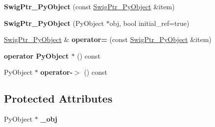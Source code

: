 \begin{DoxyCompactItemize}
\item 
\hypertarget{classswig_1_1SwigPtr__PyObject_a4282f20207f8cd22c9b079203c832a04}{
{\bfseries SwigPtr\_\-PyObject} (const \hyperlink{classswig_1_1SwigPtr__PyObject}{SwigPtr\_\-PyObject} \&item)}
\label{d2/d50/classswig_1_1SwigPtr__PyObject_a4282f20207f8cd22c9b079203c832a04}

\item 
\hypertarget{classswig_1_1SwigPtr__PyObject_a4503d58d577d209f5e1fa67026852505}{
{\bfseries SwigPtr\_\-PyObject} (PyObject $\ast$obj, bool initial\_\-ref=true)}
\label{d2/d50/classswig_1_1SwigPtr__PyObject_a4503d58d577d209f5e1fa67026852505}

\item 
\hypertarget{classswig_1_1SwigPtr__PyObject_a86d8657d6b4a27c8e9e6942bc1ba572c}{
\hyperlink{classswig_1_1SwigPtr__PyObject}{SwigPtr\_\-PyObject} \& {\bfseries operator=} (const \hyperlink{classswig_1_1SwigPtr__PyObject}{SwigPtr\_\-PyObject} \&item)}
\label{d2/d50/classswig_1_1SwigPtr__PyObject_a86d8657d6b4a27c8e9e6942bc1ba572c}

\item 
\hypertarget{classswig_1_1SwigPtr__PyObject_aa2f1cdba0651c7a52482d225faef0574}{
{\bfseries operator PyObject $\ast$} () const }
\label{d2/d50/classswig_1_1SwigPtr__PyObject_aa2f1cdba0651c7a52482d225faef0574}

\item 
\hypertarget{classswig_1_1SwigPtr__PyObject_a97a20cad6a2b0916f39c45555fb559f0}{
PyObject $\ast$ {\bfseries operator-\/$>$} () const }
\label{d2/d50/classswig_1_1SwigPtr__PyObject_a97a20cad6a2b0916f39c45555fb559f0}

\end{DoxyCompactItemize}
\subsection*{Protected Attributes}
\begin{DoxyCompactItemize}
\item 
\hypertarget{classswig_1_1SwigPtr__PyObject_abb14c2948572bd4bf429540f7770831e}{
PyObject $\ast$ {\bfseries \_\-obj}}
\label{d2/d50/classswig_1_1SwigPtr__PyObject_abb14c2948572bd4bf429540f7770831e}

\end{DoxyCompactItemize}


